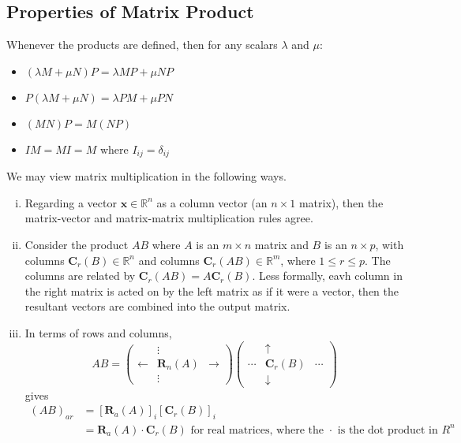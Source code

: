 \documentclass{article}
\begin{document}
\subsection{Properties of Matrix Product}
Whenever the products are defined, then for any scalars $\lambda$ and $\mu$:
\begin{itemize}
	\item $(\lambda M + \mu N)P = \lambda MP + \mu NP$
	\item $P(\lambda M + \mu N) = \lambda PM + \mu PN$
	\item $(MN)P = M(NP)$
	\item $IM = MI = M$ where $I_{ij} = \delta_{ij}$
\end{itemize}
We may view matrix multiplication in the following ways.
\begin{enumerate}[(i)]
	\item Regarding a vector $\bm x \in \mathbb R^n$ as a column vector (an $n \times 1$ matrix), then the matrix-vector and matrix-matrix multiplication rules agree.
	\item Consider the product $AB$ where $A$ is an $m \times n$ matrix and $B$ is an $n \times p$, with columns $\bm C_r(B) \in \mathbb R^n$ and columns $\bm C_r(AB) \in \mathbb R^m$, where $1 \leq r \leq p$. The columns are related by $\bm C_r(AB) = A \bm C_r(B)$. Less formally, eavh column in the right matrix is acted on by the left matrix as if it were a vector, then the resultant vectors are combined into the output matrix.
	\item In terms of rows and columns,
	      \[ AB = \begin{pmatrix}
			                 & \vdots     &             \\
			      \leftarrow & \bm R_n(A) & \rightarrow \\
			                 & \vdots     &
		      \end{pmatrix} \begin{pmatrix}
			             & \uparrow   &        \\
			      \cdots & \bm C_r(B) & \cdots \\
			             & \downarrow &
		      \end{pmatrix} \]
	      gives
	      \begin{align*}
		      (AB)_{ar} & = \left[ \bm R_a(A) \right]_i \left[ \bm C_r(B) \right]_i                                              \\
		                & = \bm R_a(A) \cdot \bm C_r(B) \text{ for real matrices, where the $\cdot$ is the dot product in $R^n$}
	      \end{align*}
\end{enumerate}
\end{document}
